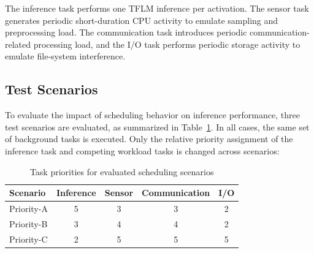 \documentclass[conference]{IEEEtran}
\begin{document}
The inference task performs one TFLM inference per activation. The sensor task generates periodic short-duration CPU activity to emulate sampling and preprocessing load. The communication task introduces periodic communication-related processing load, and the I/O task performs periodic storage activity to emulate file-system interference. %

\subsection{Test Scenarios}

To evaluate the impact of scheduling behavior on inference performance, three test scenarios are evaluated, as summarized in Table~\ref{tab:test_scenarios}. %
In all cases, the same set of background tasks is executed. %
Only the relative priority assignment of the inference task and competing workload tasks is changed across scenarios:
\begin{table}[h]
\centering
\caption{Task priorities for evaluated scheduling scenarios}
\label{tab:test_scenarios}
\begin{tabular}{lcccc}
\hline
\textbf{Scenario} & \textbf{Inference} & \textbf{Sensor} & \textbf{Communication} & \textbf{I/O} \\
\hline
Priority-A & 5 & 3 & 3 & 2 \\
Priority-B & 3 & 4 & 4 & 2 \\
Priority-C & 2 & 5 & 5 & 5 \\
\hline
\end{tabular}
\end{table}
\end{document}

